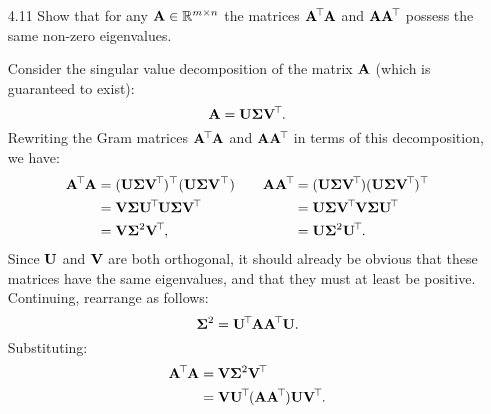 \documentclass[11pt]{article}
\begin{document}
\begin{enumerate}
    \item[4.11] Show that for any $\mathbf{A} \in \mathbb{R}^{m \times n}$ the matrices $\mathbf{A}^{\mkern-2.5mu\top\mkern-2mu} \mathbf{A}$ and $\mathbf{A} \mathbf{A}^{\mkern-2.5mu\top\mkern-2mu}$ possess the same non-zero eigenvalues.

          \vspace{1em}

          Consider the singular value decomposition of the matrix $\mathbf{A}$ (which is guaranteed to exist):
          \[
              \mathbf{A} = \mathbf{U} \mathbf{\Sigma} \mathbf{V}^{\mkern-2.5mu\top\mkern-2mu}.
          \]
          Rewriting the Gram matrices $\mathbf{A}^{\mkern-2.5mu\top\mkern-2mu} \mathbf{A}$ and $\mathbf{A} \mathbf{A}^{\mkern-2.5mu\top\mkern-2mu}$ in terms of
          this decomposition, we have:
          \[
              \begin{aligned}
                  \mat{A}^{\T} \mat{A} & = (\mat{U} \mat{\Sigma} \mat{V}^{\T})^\top (\mat{U} \mat{\Sigma} \mat{V}^\top) \\
                                       & = \mat{V} \mat{\Sigma} \mat{U}^{\T} \mat{U} \mat{\Sigma} \mat{V}^{\T}          \\
                                       & = \mat{V} \mat{\Sigma}^2 \mat{V}^{\T},
              \end{aligned}
              \qquad
              \begin{aligned}
                  \mat{A} \mat{A}^{\T} & = (\mat{U} \mat{\Sigma} \mat{V}^{\T}) (\mat{U} \mat{\Sigma} \mat{V}^{\T})^\top \\
                                       & = \mat{U} \mat{\Sigma} \mat{V}^{\T} \mat{V} \mat{\Sigma} \mat{U}^{\T}          \\
                                       & = \mat{U} \mat{\Sigma}^2 \mat{U}^{\T}.
              \end{aligned}
          \]
          Since $\mathbf{U}$ and $\mathbf{V}$ are both orthogonal, it should already be obvious that these
          matrices have the same eigenvalues, and that they must at least be positive.  Continuing,
          rearrange as follows:
          \[
              \mathbf{\Sigma}^2 = \mathbf{U}^{\mkern-2.5mu\top\mkern-2mu} \mathbf{A} \mathbf{A}^{\mkern-2.5mu\top\mkern-2mu} \mathbf{U}.
          \]
          Substituting:
          \[
              \begin{aligned}
                  \mathbf{A}^{\mkern-2.5mu\top\mkern-2mu} \mathbf{A} & = \mathbf{V} \mathbf{\Sigma}^2 \mathbf{V}^{\mkern-2.5mu\top\mkern-2mu}                               \\
                                       & = \mathbf{V} \mathbf{U}^{\mkern-2.5mu\top\mkern-2mu} (\mathbf{A} \mathbf{A}^{\mkern-2.5mu\top\mkern-2mu}) \mathbf{U} \mathbf{V}^{\mkern-2.5mu\top\mkern-2mu}.
              \end{aligned}
          \]


\end{enumerate}
\end{document}
